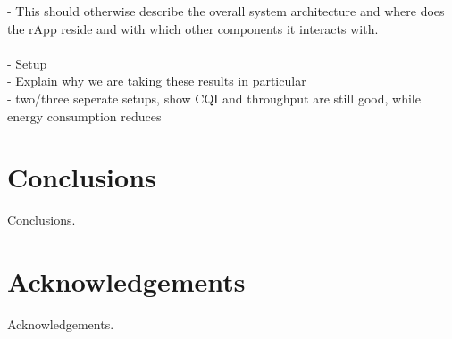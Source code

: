 \documentclass[conference]{IEEEtran}
\begin{document}
- This should otherwise describe the overall system architecture and where does the rApp reside and
with which other components it interacts with.\\
\\
- Setup \\
- Explain why we are taking these results in particular \\
- two/three seperate setups, show CQI and throughput are still good, while energy consumption reduces \\

\section{Conclusions}
Conclusions.

\section{Acknowledgements}
Acknowledgements.

\vspace{12pt}
\end{document}

